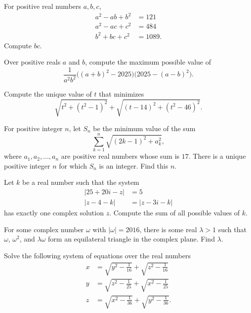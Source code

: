 \documentclass[11pt]{scrartcl}
\begin{document}
\begin{problem}[RAMC 2023/15]
    For positive real numbers $a,b,c$,
    \begin{align*}
        a^2 - ab + b^2 &= 121 \\
        a^2 - ac + c^2 &= 484 \\
        b^2 + bc + c^2 &= 1089.
    \end{align*}
    Compute $bc$.
\end{problem}

\begin{problem}
    Over positive reals $a$ and $b$, compute the maximum possible value of
    \[\frac1{a^2b^2}\bigl((a + b)^2 - 2025\bigr)\bigl(2025 - (a - b)^2\bigr).\]
\end{problem}

\begin{problem}[Prize 2022/1]
    Compute the unique value of $t$ that minimizes
    \[\sqrt{t^2 + (t^2 - 1)^2} + \sqrt{(t - 14)^2 + (t^2 - 46)^2}.\]
\end{problem}

\begin{problem}[AIME 1991/15]\label{pro:jeff_3}
    For positive integer $n$, let $S_n$ be the minimum value of the sum
    \[\sum_{k = 1}^n \sqrt{(2k - 1)^2 + a_k^2},\]
    where $a_1,a_2,\dots,a_n$ are positive real numbers whose sum is $17$. There is a unique positive integer $n$ for which $S_n$ is an integer. Find this $n$.
\end{problem}

\begin{problem}[AIME I 2025/8]\label{pro:masc_1}
    Let $k$ be a real number such that the system
    \begin{align*}
        \lvert 25+20i-z\rvert &= 5 \\
        \lvert z-4-k\rvert &= \lvert z-3i-k\rvert
    \end{align*}
    has exactly one complex solution $z$. Compute the sum of all possible values of $k$.
\end{problem}

\begin{problem}[CMIMC 2016/A6]\label{pro:masc_2}
    For some complex number $\omega$ with $\lvert \omega\rvert = 2016$, there is some real $\lambda > 1$ such that $\omega$, $\omega^2$, and $\lambda\omega$ form an equilateral triangle in the complex plane. Find $\lambda$.
\end{problem}

\begin{problem}[AIME II 2006/15]
    Solve the following system of equations over the real numbers
    \begin{align*}
        x &= \sqrt{y^2-\frac{1}{16}}+\sqrt{z^2-\frac{1}{16}} \\
        y &= \sqrt{z^2-\frac{1}{25}}+\sqrt{x^2-\frac{1}{25}} \\
        z &= \sqrt{x^2-\frac{1}{36}}+\sqrt{y^2-\frac{1}{36}}.
    \end{align*}
\end{problem}
\end{document}

